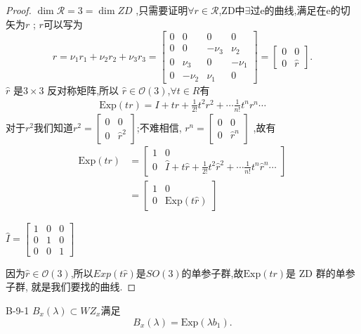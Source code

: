 \documentclass[../main.tex]{subfiles}
\begin{document}
\begin{proof}
 $\dim\mathscr{R} = 3 = \dim ZD$ ,只需要证明$\forall r\in \mathscr{R}$,ZD中$\exists $过e的曲线,满足在e的切矢为$r$ ;
 $r$可以写为 \[
 r = \nu_1 r_1 + \nu_2 r_2 +\nu_3 r_3 = \begin{bmatrix} 
   0 & 0 & 0 & 0\\
   0 & 0 & -\nu_3 & \nu_2\\
   0&\nu_3 &0 & -\nu_1\\
   0 & -\nu_2&\nu_1&0
 \end{bmatrix} = \begin{bmatrix} 0 & 0\\ 0& \hat{r} \end{bmatrix} 
 .\] 
 $\hat{r}$ 是$3\times 3$ 反对称矩阵,所以 $\hat{r} \in \mathscr{O}(3)$,$\forall t\in R$有
 \begin{align*}
   \text{Exp}(tr) = I + tr + \frac{1}{2!}t^2r^2 + \cdots \frac{1}{n!} t^n r^n \cdots
 \end{align*}
 对于$r^2$我们知道$r^2 = \begin{bmatrix} 0 & 0\\ 0 & \hat{r}^2 \end{bmatrix} $;不难相信,
 $r^n = \begin{bmatrix} 0&0\\0&\hat{r}^n \end{bmatrix} $ ,故有
 \begin{align*}
   \text{Exp}(tr) &= \begin{bmatrix} 1 & 0 \\ 0 & \hat{I} +  t \hat{r} + \frac{1}{2!}t^2\hat{r}^2 + \cdots \frac{1}{n!} t^{n} \hat{r}^{n} \cdots \end{bmatrix}\\
              &= \begin{bmatrix} 1 & 0 \\ 0 & \text{Exp}(t\hat{r}) \end{bmatrix} 
 \end{align*}
 \begin{note}
   $\hat{I} = \begin{bmatrix} 1&0&0\\0&1&0\\0&0&1 \end{bmatrix} $
 \end{note}
 因为$\hat{r} \in \mathscr{O}(3)$,所以$Exp(t \hat{r})$是$SO(3) $的单参子群,故$\text{Exp}(tr)$是 ZD 群的单参子群, 就是我们要找的曲线.
\end{proof}
\begin{theorem}{}
  {B-9-1}
  $B_x(\lambda) \subset  WZ_x$满足\[
 B_x(\lambda) = \text{Exp}(\lambda b_1)
  .\] 
\end{theorem}
\end{document}
